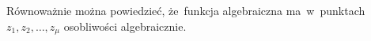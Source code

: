 \documentclass[a4paper,11pt]{article}
\begin{document}
\vspace{\spaceFour}





\noindent
{}

\vspace{\spaceFour}





\noindent
{} Równoważnie można powiedzieć, że~funkcja algebraiczna
ma~w~punktach $z_{ 1 }, z_{ 2 }, \ldots, z_{ \mu }$ osobliwości algebraicznie.

\vspace{\spaceFour}


















\end{document}
